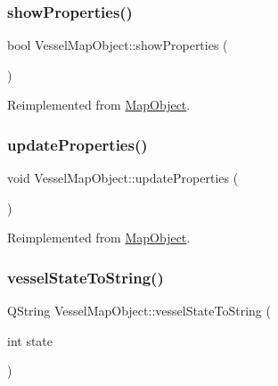 \mbox{\label{class_vessel_map_object_adb4af9fdb30c1e7501bba6f74dfd42c0}} 
\subsubsection{\texorpdfstring{showProperties()}{showProperties()}}
{\footnotesize\ttfamily bool Vessel\+Map\+Object\+::show\+Properties (\begin{DoxyParamCaption}{ }\end{DoxyParamCaption})\hspace{0.3cm}{\ttfamily [virtual]}}



Reimplemented from \mbox{\hyperlink{class_map_object_ac58ccb02d5d96d934939b217020c822c}{Map\+Object}}.

\mbox{\label{class_vessel_map_object_aba8d2fa5bdf2bbf13ade0fe2e7ba6b32}} 
\subsubsection{\texorpdfstring{updateProperties()}{updateProperties()}}
{\footnotesize\ttfamily void Vessel\+Map\+Object\+::update\+Properties (\begin{DoxyParamCaption}{ }\end{DoxyParamCaption})\hspace{0.3cm}{\ttfamily [virtual]}}



Reimplemented from \mbox{\hyperlink{class_map_object_afa7cd6a4368f4dd077614ac1d983a6c8}{Map\+Object}}.

\mbox{\label{class_vessel_map_object_ae838a6254c7ab941c6a0f373a801ad49}} 
\subsubsection{\texorpdfstring{vesselStateToString()}{vesselStateToString()}}
{\footnotesize\ttfamily Q\+String Vessel\+Map\+Object\+::vessel\+State\+To\+String (\begin{DoxyParamCaption}\item[{int}]{state }\end{DoxyParamCaption})\hspace{0.3cm}{\ttfamily [static]}}

